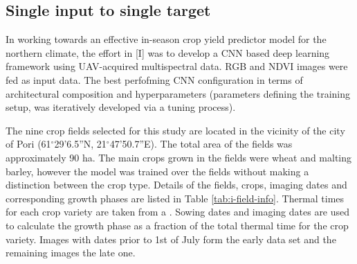 \subsection{Single input to single target}
\label{subsec:single-input-results}

In working towards an effective in-season crop yield predictor model for the northern climate, the effort in [I] was to develop a CNN based deep learning framework using UAV-acquired multispectral data. RGB and NDVI images were fed as input data. The best perfofming CNN configuration in terms of architectural composition and hyperparameters (parameters defining the training setup, was iteratively developed via a tuning process). 

The nine crop fields selected for this study are located in the vicinity of the city of Pori (61$^\circ$29'6.5''N, 21$^\circ$47'50.7''E). The total area of the fields was approximately 90 ha. The main crops grown in the fields were wheat and malting barley, however the model was trained over the fields without making a distinction between the crop type. Details of the fields, crops, imaging dates and corresponding growth phases are listed in Table \ref{tab:i-field-info}. Thermal times for each crop variety are taken from a \cite{Luke2017}. Sowing dates and imaging dates are used to calculate the growth phase as a fraction of the total thermal time for the crop variety. Images with dates prior to 1st of July form the early data set and the remaining images the late one. 

